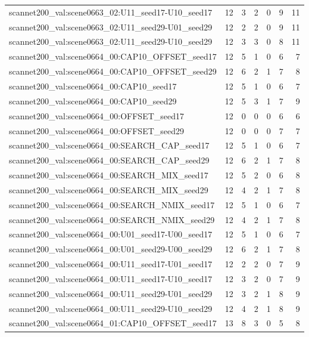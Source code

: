 \begin{table}[t]
\begin{tabular}{lrrrrrr}
scannet200\_val:scene0663\_02:U11\_seed17-U10\_seed17 & 12 & 3 & 2 & 0 & 9 & 11 \\
scannet200\_val:scene0663\_02:U11\_seed29-U01\_seed29 & 12 & 2 & 2 & 0 & 9 & 11 \\
scannet200\_val:scene0663\_02:U11\_seed29-U10\_seed29 & 12 & 3 & 3 & 0 & 8 & 11 \\
scannet200\_val:scene0664\_00:CAP10\_OFFSET\_seed17 & 12 & 5 & 1 & 0 & 6 & 7 \\
scannet200\_val:scene0664\_00:CAP10\_OFFSET\_seed29 & 12 & 6 & 2 & 1 & 7 & 8 \\
scannet200\_val:scene0664\_00:CAP10\_seed17 & 12 & 5 & 1 & 0 & 6 & 7 \\
scannet200\_val:scene0664\_00:CAP10\_seed29 & 12 & 5 & 3 & 1 & 7 & 9 \\
scannet200\_val:scene0664\_00:OFFSET\_seed17 & 12 & 0 & 0 & 0 & 6 & 6 \\
scannet200\_val:scene0664\_00:OFFSET\_seed29 & 12 & 0 & 0 & 0 & 7 & 7 \\
scannet200\_val:scene0664\_00:SEARCH\_CAP\_seed17 & 12 & 5 & 1 & 0 & 6 & 7 \\
scannet200\_val:scene0664\_00:SEARCH\_CAP\_seed29 & 12 & 6 & 2 & 1 & 7 & 8 \\
scannet200\_val:scene0664\_00:SEARCH\_MIX\_seed17 & 12 & 5 & 2 & 0 & 6 & 8 \\
scannet200\_val:scene0664\_00:SEARCH\_MIX\_seed29 & 12 & 4 & 2 & 1 & 7 & 8 \\
scannet200\_val:scene0664\_00:SEARCH\_NMIX\_seed17 & 12 & 5 & 1 & 0 & 6 & 7 \\
scannet200\_val:scene0664\_00:SEARCH\_NMIX\_seed29 & 12 & 4 & 2 & 1 & 7 & 8 \\
scannet200\_val:scene0664\_00:U01\_seed17-U00\_seed17 & 12 & 5 & 1 & 0 & 6 & 7 \\
scannet200\_val:scene0664\_00:U01\_seed29-U00\_seed29 & 12 & 6 & 2 & 1 & 7 & 8 \\
scannet200\_val:scene0664\_00:U11\_seed17-U01\_seed17 & 12 & 2 & 2 & 0 & 7 & 9 \\
scannet200\_val:scene0664\_00:U11\_seed17-U10\_seed17 & 12 & 3 & 2 & 0 & 7 & 9 \\
scannet200\_val:scene0664\_00:U11\_seed29-U01\_seed29 & 12 & 3 & 2 & 1 & 8 & 9 \\
scannet200\_val:scene0664\_00:U11\_seed29-U10\_seed29 & 12 & 4 & 2 & 1 & 8 & 9 \\
scannet200\_val:scene0664\_01:CAP10\_OFFSET\_seed17 & 13 & 8 & 3 & 0 & 5 & 8 \\

\end{tabular}
\end{table}
